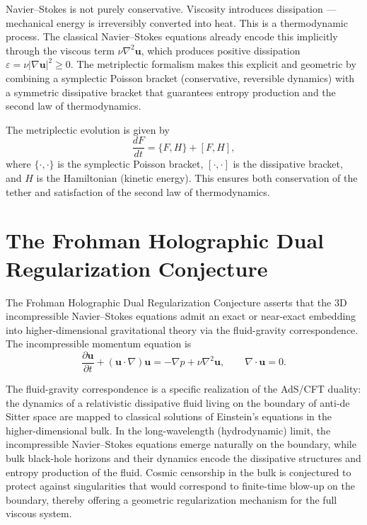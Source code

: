 \documentclass[11pt,a4paper]{article}
\begin{document}
Navier–Stokes is not purely conservative. Viscosity introduces dissipation — mechanical energy is irreversibly converted into heat. This is a thermodynamic process. The classical Navier–Stokes equations already encode this implicitly through the viscous term \(\nu \nabla^2 \mathbf{u}\), which produces positive dissipation \(\varepsilon = \nu |\nabla \mathbf{u}|^2 \geq 0\). The metriplectic formalism makes this explicit and geometric by combining a symplectic Poisson bracket (conservative, reversible dynamics) with a symmetric dissipative bracket that guarantees entropy production and the second law of thermodynamics.

The metriplectic evolution is given by
\begin{equation}
\frac{dF}{dt} = \{F, H\} + [F, H],
\end{equation}
where \(\{ \cdot, \cdot \}\) is the symplectic Poisson bracket, \([ \cdot, \cdot ]\) is the dissipative bracket, and \(H\) is the Hamiltonian (kinetic energy). This ensures both conservation of the tether and satisfaction of the second law of thermodynamics.

\section{The Frohman Holographic Dual Regularization Conjecture}
The Frohman Holographic Dual Regularization Conjecture asserts that the 3D incompressible Navier--Stokes equations admit an exact or near-exact embedding into higher-dimensional gravitational theory via the fluid-gravity correspondence. The incompressible momentum equation is
\begin{equation}
\frac{\partial \mathbf{u}}{\partial t} + (\mathbf{u} \cdot \nabla) \mathbf{u} = -\nabla p + \nu \nabla^2 \mathbf{u}, \qquad \nabla \cdot \mathbf{u} = 0.
\end{equation}

The fluid-gravity correspondence is a specific realization of the AdS/CFT duality: the dynamics of a relativistic dissipative fluid living on the boundary of anti-de Sitter space are mapped to classical solutions of Einstein’s equations in the higher-dimensional bulk. In the long-wavelength (hydrodynamic) limit, the incompressible Navier–Stokes equations emerge naturally on the boundary, while bulk black-hole horizons and their dynamics encode the dissipative structures and entropy production of the fluid. Cosmic censorship in the bulk is conjectured to protect against singularities that would correspond to finite-time blow-up on the boundary, thereby offering a geometric regularization mechanism for the full viscous system.
\end{document}
